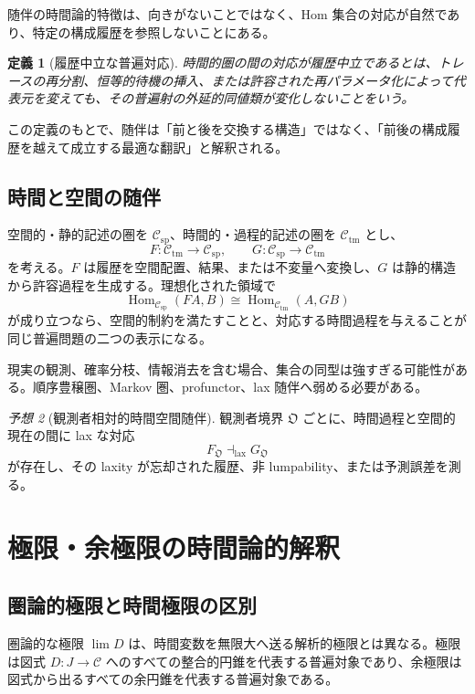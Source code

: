 \documentclass[a4paper,11pt]{ltjsarticle}
\newtheorem{definition}{定義}[section]
\theoremstyle{remark}
\newtheorem{conjecture}[definition]{予想}
\newcommand{\C}{\mathcal C}
\newcommand{\Hom}{\operatorname{Hom}}
\newcommand{\liminv}{\operatorname*{lim}}
\begin{document}
随伴の時間論的特徴は、向きがないことではなく、Hom 集合の対応が自然であり、特定の構成履歴を参照しないことにある。

\begin{definition}[履歴中立な普遍対応]
時間的圏の間の対応が履歴中立であるとは、トレースの再分割、恒等的待機の挿入、または許容された再パラメータ化によって代表元を変えても、その普遍射の外延的同値類が変化しないことをいう。
\end{definition}

この定義のもとで、随伴は「前と後を交換する構造」ではなく、「前後の構成履歴を越えて成立する最適な翻訳」と解釈される。

\subsection{時間と空間の随伴}
空間的・静的記述の圏を $\C_{\mathrm{sp}}$、時間的・過程的記述の圏を $\C_{\mathrm{tm}}$ とし、
\begin{equation}
 F:\C_{\mathrm{tm}}\to\C_{\mathrm{sp}},
 \qquad
 G:\C_{\mathrm{sp}}\to\C_{\mathrm{tm}}
\end{equation}
を考える。$F$ は履歴を空間配置、結果、または不変量へ変換し、$G$ は静的構造から許容過程を生成する。理想化された領域で
\begin{equation}
 \Hom_{\C_{\mathrm{sp}}}(FA,B)
 \cong
 \Hom_{\C_{\mathrm{tm}}}(A,GB)
 \label{eq:space-time-adjunction}
\end{equation}
が成り立つなら、空間的制約を満たすことと、対応する時間過程を与えることが同じ普遍問題の二つの表示になる。

現実の観測、確率分枝、情報消去を含む場合、集合の同型は強すぎる可能性がある。順序豊穣圏、Markov 圏、profunctor、lax 随伴へ弱める必要がある。

\begin{conjecture}[観測者相対的時間空間随伴]
観測者境界 $\mathfrak O$ ごとに、時間過程と空間的現在の間に lax な対応
\begin{equation}
 F_{\mathfrak O}\dashv_{\mathrm{lax}}G_{\mathfrak O}
\end{equation}
が存在し、その laxity が忘却された履歴、非 lumpability、または予測誤差を測る。
\end{conjecture}

\section{極限・余極限の時間論的解釈}

\subsection{圏論的極限と時間極限の区別}
圏論的な極限 $\liminv D$ は、時間変数を無限大へ送る解析的極限とは異なる。極限は図式 $D:J\to\C$ へのすべての整合的円錐を代表する普遍対象であり、余極限は図式から出るすべての余円錐を代表する普遍対象である\cite{MacLane1998}。
\end{document}
